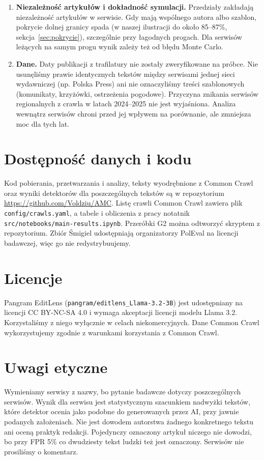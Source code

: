 \documentclass[11pt,a4paper]{article}
\begin{document}
\begin{enumerate}
\item \textbf{Niezależność artykułów i dokładność symulacji.} Przedziały zakładają niezależność artykułów w serwisie. Gdy mają wspólnego autora albo szablon, pokrycie dolnej granicy spada (w naszej ilustracji do około 85--87\%, sekcja~\ref{sec:pokrycie}), szczególnie przy łagodnych progach. Dla serwisów leżących na samym progu wynik zależy też od błędu Monte Carlo.
\item \textbf{Dane.} Daty publikacji z trafilatury nie zostały zweryfikowane na próbce. Nie usunęliśmy prawie identycznych tekstów między serwisami jednej sieci wydawniczej (np. Polska Press) ani nie oznaczyliśmy treści szablonowych (komunikaty, krzyżówki, ostrzeżenia pogodowe). Przyczyna znikania serwisów regionalnych z crawla w latach 2024--2025 nie jest wyjaśniona. Analiza wewnątrz serwisów chroni przed jej wpływem na porównanie, ale zmniejsza moc dla tych lat.
\end{enumerate}

\section*{Dostępność danych i kodu}

Kod pobierania, przetwarzania i analizy, teksty wyodrębnione z Common Crawl oraz wyniki detektorów dla poszczególnych tekstów są w repozytorium \url{https://github.com/Voldziu/AMC}. Listę crawli Common Crawl zawiera plik \texttt{config/crawls.yaml}, a tabele i obliczenia z pracy notatnik \texttt{src/notebooks/main-results.ipynb}. Przeróbki G2 można odtworzyć skryptem z repozytorium. Zbiór Śmigiel udostępniają organizatorzy PolEval na licencji badawczej, więc go nie redystrybuujemy.

\section*{Licencje}

Pangram EditLens (\texttt{pangram/editlens\_Llama-3.2-3B}) jest udostępniany na licencji CC BY-NC-SA 4.0 i wymaga akceptacji licencji modelu Llama 3.2. Korzystaliśmy z niego wyłącznie w celach niekomercyjnych. Dane Common Crawl wykorzystujemy zgodnie z warunkami korzystania z Common Crawl.

\section*{Uwagi etyczne}

Wymieniamy serwisy z nazwy, bo pytanie badawcze dotyczy poszczególnych serwisów. Wynik dla serwisu jest statystycznym szacunkiem nadwyżki tekstów, które detektor ocenia jako podobne do generowanych przez AI, przy jawnie podanych założeniach. Nie jest dowodem autorstwa żadnego konkretnego tekstu ani oceną praktyk redakcji. Pojedynczy oznaczony artykuł niczego nie dowodzi, bo przy FPR 5\% co dwudziesty tekst ludzki też jest oznaczony. Serwisów nie prosiliśmy o komentarz.
\end{document}
